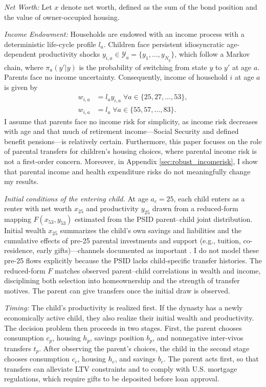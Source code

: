 \documentclass[12pt]{article}
\begin{document}
\textit{Net Worth:} Let $x$ denote net worth, defined as the sum of the bond position and the value of owner-occupied housing.

\textit{Income Endowment:} Households are endowed with an income process with a deterministic life-cycle profile $l_a$. Children face persistent idiosyncratic age-dependent productivity shocks $y_{i,a}\in\mathcal{Y}_a=\{y_1,\dots,y_{N_y}\}$, which follow a Markov chain, where $\pi_a(y'|y)$ is the probability of switching from state $y$ to $y'$ at age $a$. Parents face no income uncertainty. Consequently, income of household $i$ at age $a$ is given by
\begin{align}
w_{i,a} &= l_ay_{i,a} \; \forall a\in\{25,27,\dots,53\}, \label{eq:wk} \\
w_{i,a} &= l_a \; \forall a\in\{55,57,\dots,83\}. \label{eq:wp}
\end{align}
I assume that parents face no income risk for simplicity, as income risk decreases with age \citep{Sanchez2020} and that much of retirement income---Social Security and defined benefit pensions---is relatively certain. Furthermore, this paper focuses on the role of parental transfers for children's housing choices, where parental income risk is not a first-order concern. Moreover, in Appendix \ref{sec:robust_incomerisk}, I show that parental income and health expenditure risks do not meaningfully change my results.

\textit{Initial conditions of the entering child.} At age $a_c=25$, each child enters as a renter with net worth $x_{25}$ and productivity $y_{25}$ drawn from a reduced-form mapping $F(x_{53},y_{53})$ estimated from the PSID parent–child joint distribution. Initial wealth $x_{25}$ summarizes the child’s own savings and liabilities and the cumulative effects of pre-25 parental investments and support (e.g., tuition, co-residence, early gifts)---channels documented as important \citep[e.g.,][]{Daruich2018,Lee2019}. I do not model these pre-25 flows explicitly because the PSID lacks child-specific transfer histories. The reduced-form $F$ matches observed parent–child correlations in wealth and income, disciplining both selection into homeownership and the strength of transfer motives. The parent can give transfers once the initial draw is observed.

\textit{Timing:} The child's productivity is realized first. If the dynasty has a newly economically active child, they also realize their initial wealth and productivity. The decision problem then proceeds in two stages. First, the parent chooses consumption $c_p$, housing $h_p$, savings position $b_p$, and nonnegative inter-vivos transfers $t_p$. After observing the parent's choices, the child in the second stage chooses consumption $c_c$, housing $h_c$, and savings $b_c$. The parent acts first, so that transfers can alleviate LTV constraints and to comply with U.S. mortgage regulations, which require gifts to be deposited before loan approval.
\end{document}
